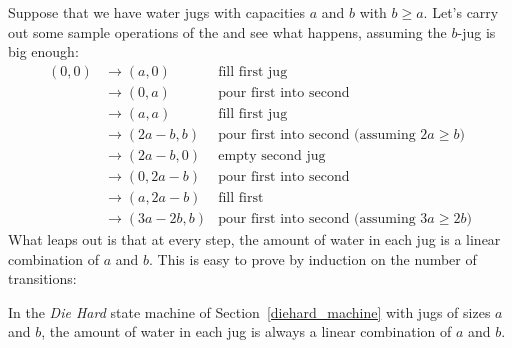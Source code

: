 Suppose that we have water jugs with capacities $a$ and $b$ with $b
\geq a$.  Let's carry out some sample operations of the 
and see what happens, assuming the $b$-jug is big enough:
\begin{align*}
(0,0) & \rightarrow (a,0) & \text{fill first jug} \\
& \rightarrow (0,a) & \text{pour first
    into second} \\
& \rightarrow (a, a) & \text{fill first jug} \\
& \rightarrow (2a-b, b)
  & \text{pour first into second (assuming $2a \geq b$)} \\
& \rightarrow (2a-b, 0) &
  \text{empty second jug} \\
& \rightarrow (0, 2a-b) & \text{pour first into second} \\
&
  \rightarrow (a, 2a-b) & \text{fill first} \\
& \rightarrow (3a-2b, b) & \text{pour first
    into second (assuming $3a \geq 2b$)}
\end{align*}
What leaps out is that at every step, the amount of water in each jug
is a linear combination of $a$ and $b$.  This is easy to prove by
induction on the number of transitions:
\begin{lemma}\label{lem:waterjugs}
In the \emph{Die Hard} state machine of
Section~\ref{diehard_machine} with jugs of sizes $a$ and $b$, the
amount of water in each jug is always a linear combination of $a$ and
$b$.
\end{lemma}

